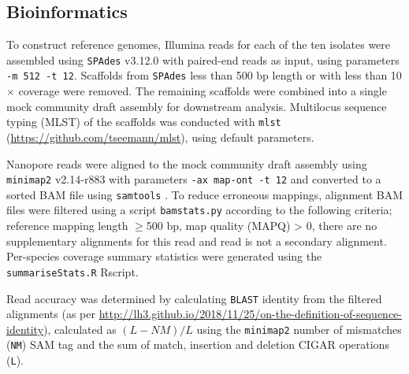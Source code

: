 \documentclass[a4paper,num-refs]{oup-contemporary}
\begin{document}
\subsection{Bioinformatics}
To construct reference genomes, Illumina reads for each of the ten isolates were assembled using \texttt{SPAdes} v3.12.0 \cite{Bankevich2012-iu} with paired-end reads as input, using parameters \texttt{-m 512 -t 12}.
Scaffolds from \texttt{SPAdes} less than 500 bp length or with less than 10$\times$ coverage were removed. The remaining scaffolds were combined into a single mock community draft assembly for downstream analysis.
Multilocus sequence typing (MLST) of the scaffolds was conducted with \texttt{mlst} (\url{https://github.com/tseemann/mlst}), using default parameters.

Nanopore reads were aligned to the mock community draft assembly using \texttt{minimap2} \cite{li2018minimap2} v2.14-r883 with parameters \texttt{-ax map-ont -t 12} and converted to a sorted BAM file using \texttt{samtools} \cite{li2009sequence}.
To reduce erroneous mappings, alignment BAM files were filtered using a script \texttt{bamstats.py} according to the following criteria; reference mapping length $\geq$500 bp, map quality (MAPQ) > 0, there are no supplementary alignments for this read and read is not a secondary alignment.
Per-species coverage summary statistics were generated using the \texttt{summariseStats.R} Rscript. 


Read accuracy was determined by calculating \texttt{BLAST} identity from the filtered alignments (as per \url{http://lh3.github.io/2018/11/25/on-the-definition-of-sequence-identity}), calculated as $(L-NM)/L$ using the \texttt{minimap2} number of mismatches (\texttt{NM}) SAM tag and the sum of match, insertion and deletion CIGAR operations (\texttt{L}). 
\end{document}
